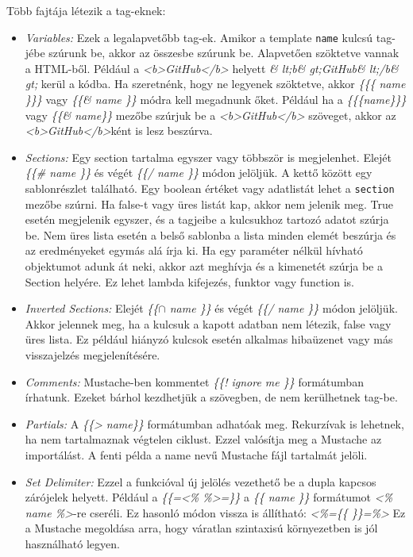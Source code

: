 Több fajtája létezik a tag-eknek:
\begin{itemize}
\item \emph{Variables:}
Ezek a legalapvetőbb tag-ek.
Amikor a template \texttt{name} kulcsú tag-jébe szúrunk be, akkor az összesbe szúrunk be.
Alapvetően szöktetve vannak a HTML-ből.
Például a \textit{<b>GitHub</b>} helyett \textit{\& lt;b\& gt;GitHub\& lt;/b\& gt;} kerül a kódba.
Ha szeretnénk, hogy ne legyenek szöktetve, akkor \textit{\{\{\{ name \}\}\}} vagy \textit{\{\{\& name \}\}} módra kell megadnunk őket.
Például ha a \textit{\{\{\{name\}\}\}} vagy \textit{\{\{\& name\}\}} mezőbe szúrjuk be a \textit{<b>GitHub</b>} szöveget, akkor az \textit{<b>GitHub</b>}ként is lesz beszúrva.
\item \emph{Sections:}
Egy section tartalma egyszer vagy többször is megjelenhet.
Elejét \textit{\{\{\# name \}\}} és végét \textit{\{\{/ name \}\}} módon jelöljük.
A kettő között egy sablonrészlet található.
Egy boolean értéket vagy adatlistát lehet a \texttt{section} mezőbe szúrni.
Ha false-t vagy üres listát kap, akkor nem jelenik meg.
True esetén megjelenik egyszer, és a tagjeibe a kulcsukhoz tartozó adatot szúrja be.
Nem üres lista esetén a belső sablonba a lista minden elemét beszúrja és az eredményeket egymás alá írja ki.
Ha egy paraméter nélkül hívható objektumot adunk át neki, akkor azt meghívja és a kimenetét szúrja be a Section helyére.
Ez lehet lambda kifejezés, funktor vagy function is.
\item \emph{Inverted Sections:}
Elejét \textit{\{\{$\cap$ name \}\}} és végét \textit{\{\{/ name \}\}} módon jelöljük.
Akkor jelennek meg, ha a kulcsuk a kapott adatban nem létezik, false vagy üres lista.
Ez például hiányzó kulcsok esetén alkalmas hibaüzenet vagy más visszajelzés megjelenítésére.
\item \emph{Comments:}
Mustache-ben kommentet \textit{\{\{! ignore me \}\}} formátumban írhatunk.
Ezeket bárhol kezdhetjük a szövegben, de nem kerülhetnek tag-be.
\item \emph{Partials:}
A \textit{\{\{> name\}\}} formátumban adhatóak meg.
Rekurzívak is lehetnek, ha nem tartalmaznak végtelen ciklust.
Ezzel valósítja meg a Mustache az importálást.
A fenti példa a name nevű Mustache fájl tartalmát jelöli.
\item \emph{Set Delimiter:}
Ezzel a funkcióval új jelölés vezethető be a dupla kapcsos zárójelek helyett.
Például a \textit{\{\{=<\% \%>=\}\}} a \textit{\{\{ name \}\}} formátumot \textit{<\% name \%>}-re cseréli.
Ez hasonló módon vissza is állítható: \textit{<\%=\{\{ \}\}=\%>}
Ez a Mustache megoldása arra, hogy váratlan szintaxisú környezetben is jól használható legyen.
\end{itemize}


